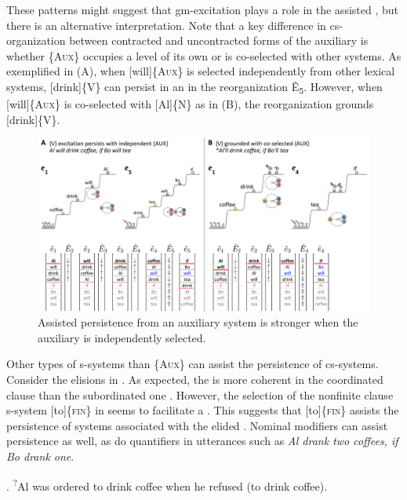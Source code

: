   These patterns might suggest that gm-excitation plays a role in the assisted , but there is an alternative interpretation. Note that a key difference in cs-organization between contracted and uncontracted forms of the auxiliary is whether \{A\textsc{ux}\} occupies a level of its own or is co-selected with other systems. As exemplified in {}(A), when [will]\{A\textsc{ux}\} is selected independently from other lexical systems, [drink]\{V\} can persist in an  in the reorganization Ê\textsubscript{5}. However, when [will]\{A\textsc{ux}\} is co-selected with [Al]\{N\} as in {}(B), the reorganization grounds [drink]\{V\}.

  
\begin{figure}
\includegraphics[width=\textwidth]{figures/Tilsen-img148.png}
\caption{Assisted persistence from an auxiliary system is stronger when the auxiliary is independently selected.}
\label{fig:7:4}
\end{figure}
 

  Other types of s-systems than \{A\textsc{ux}\} can assist the persistence of cs-systems. Consider the  elisions in . As expected, the  is more coherent in the coordinated clause  than the subordinated one . However, the selection of the nonfinite clause s-system [to]\{\textsc{fin}\} in  seems to facilitate a . This suggests that [to]\{\textsc{fin}\} assists the persistence of systems associated with the elided . Nominal modifiers can assist persistence as well, as do quantifiers in utterances such as \textit{Al drank two coffees, if Bo drank one}.

\ea\label{ex:7:6}
.\label{ex:7:6a}
\ex\textsuperscript{?}{Al was ordered to drink coffee when he refused (to drink coffee)}.\label{ex:7:6b}
\label{ex:7:6c}
\z
\z

